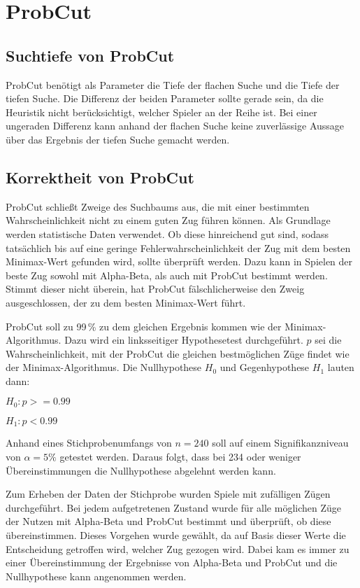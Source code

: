 
\section{ProbCut}

\subsection{Suchtiefe von ProbCut}
ProbCut benötigt als Parameter die Tiefe der flachen Suche und die Tiefe der tiefen Suche. Die Differenz der beiden
Parameter sollte gerade sein, da die Heuristik nicht berücksichtigt, welcher Spieler an der Reihe ist. Bei einer
ungeraden Differenz kann anhand der flachen Suche keine zuverlässige Aussage über das Ergebnis der tiefen Suche gemacht
werden.

\subsection{Korrektheit von ProbCut}
ProbCut schließt Zweige des Suchbaums aus, die mit einer bestimmten Wahrscheinlichkeit nicht zu einem guten Zug führen
können. Als Grundlage werden statistische Daten verwendet. Ob diese hinreichend gut sind, sodass tatsächlich bis auf
eine geringe Fehlerwahrscheinlichkeit der Zug mit dem besten Minimax-Wert gefunden wird, sollte überprüft werden. Dazu
kann in Spielen der beste Zug sowohl mit Alpha-Beta, als auch mit ProbCut bestimmt werden. Stimmt dieser nicht überein,
hat ProbCut fälschlicherweise den Zweig ausgeschlossen, der zu dem besten Minimax-Wert führt.

ProbCut soll zu 99\,\% zu dem gleichen Ergebnis kommen wie der Minimax-Algorithmus. Dazu wird ein linksseitiger
Hypothesetest durchgeführt. $p$ sei die Wahrscheinlichkeit, mit der ProbCut die gleichen bestmöglichen Züge findet wie
der Minimax-Algorithmus. Die Nullhypothese $H_0$ und Gegenhypothese $H_1$ lauten dann:

\hspace*{1.3cm}
$H_0:p>=0.99$

\hspace*{1.3cm}
$H_1:p<0.99$

Anhand eines Stichprobenumfangs von $n=240$ soll auf einem Signifikanzniveau von $\alpha=5\%$ getestet werden. Daraus
folgt, dass bei 234 oder weniger Übereinstimmungen die Nullhypothese abgelehnt werden kann.

Zum Erheben der Daten der Stichprobe wurden Spiele mit zufälligen Zügen durchgeführt. Bei jedem aufgetretenen Zustand
wurde für alle möglichen Züge der Nutzen mit Alpha-Beta und ProbCut bestimmt und überprüft, ob diese übereinstimmen.
Dieses Vorgehen wurde gewählt, da auf Basis dieser Werte die Entscheidung getroffen wird, welcher Zug gezogen wird.
Dabei kam es immer zu einer Übereinstimmung der Ergebnisse von Alpha-Beta und ProbCut und die Nullhypothese kann
angenommen werden.
